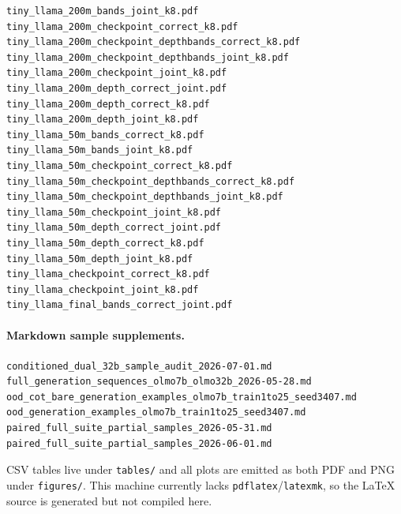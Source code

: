 \documentclass[10pt]{article}
\begin{document}
\begin{verbatim}
tiny_llama_200m_bands_joint_k8.pdf
tiny_llama_200m_checkpoint_correct_k8.pdf
tiny_llama_200m_checkpoint_depthbands_correct_k8.pdf
tiny_llama_200m_checkpoint_depthbands_joint_k8.pdf
tiny_llama_200m_checkpoint_joint_k8.pdf
tiny_llama_200m_depth_correct_joint.pdf
tiny_llama_200m_depth_correct_k8.pdf
tiny_llama_200m_depth_joint_k8.pdf
tiny_llama_50m_bands_correct_k8.pdf
tiny_llama_50m_bands_joint_k8.pdf
tiny_llama_50m_checkpoint_correct_k8.pdf
tiny_llama_50m_checkpoint_depthbands_correct_k8.pdf
tiny_llama_50m_checkpoint_depthbands_joint_k8.pdf
tiny_llama_50m_checkpoint_joint_k8.pdf
tiny_llama_50m_depth_correct_joint.pdf
tiny_llama_50m_depth_correct_k8.pdf
tiny_llama_50m_depth_joint_k8.pdf
tiny_llama_checkpoint_correct_k8.pdf
tiny_llama_checkpoint_joint_k8.pdf
tiny_llama_final_bands_correct_joint.pdf
\end{verbatim}

\paragraph{Markdown sample supplements.}
\begin{verbatim}
conditioned_dual_32b_sample_audit_2026-07-01.md
full_generation_sequences_olmo7b_olmo32b_2026-05-28.md
ood_cot_bare_generation_examples_olmo7b_train1to25_seed3407.md
ood_generation_examples_olmo7b_train1to25_seed3407.md
paired_full_suite_partial_samples_2026-05-31.md
paired_full_suite_partial_samples_2026-06-01.md
\end{verbatim}

CSV tables live under \texttt{tables/} and all plots are emitted as both PDF and PNG under \texttt{figures/}. This machine currently lacks \texttt{pdflatex}/\texttt{latexmk}, so the LaTeX source is generated but not compiled here.
\end{document}
